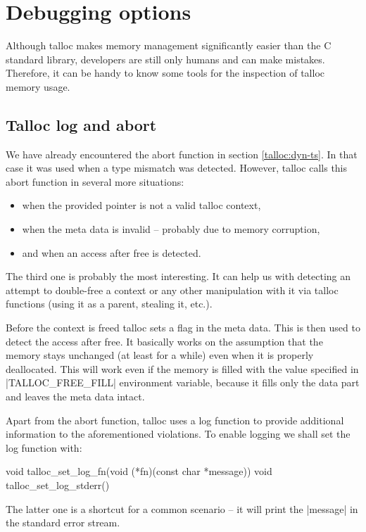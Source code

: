 \section{Debugging options}
\label{talloc:sec:debugging}

Although talloc makes memory management significantly easier than the C standard
library, developers are still only humans and can make mistakes. Therefore, it
can be handy to know some tools for the inspection of talloc memory usage.

\subsection{Talloc log and abort}

We have already encountered the abort function in section \ref{talloc:dyn-ts}.
In that case it was used when a type mismatch was detected. However, talloc
calls this abort function in several more situations:

\begin{itemize}
  \item when the provided pointer is not a valid talloc context,
  \item when the meta data is invalid -- probably due to memory corruption,
  \item and when an access after free is detected.
\end{itemize}

\noindent
The third one is probably the most interesting. It can help us with detecting
an attempt to double-free a context or any other manipulation with it via
talloc functions (using it as a parent, stealing it, etc.).

Before the context is freed talloc sets a flag in the meta data. This is then
used to detect the access after free. It basically works on the assumption that
the memory stays unchanged (at least for a while) even when it is properly
deallocated. This will work even if the memory is filled with the value
specified in |TALLOC_FREE_FILL| environment variable, because it fills only
the data part and leaves the meta data intact.

Apart from the abort function, talloc uses a log function to provide additional
information to the aforementioned violations. To enable logging we shall set the
log function with:

\begin{funcproto}
void talloc_set_log_fn(void (*fn)(const char *message))
void talloc_set_log_stderr()
\end{funcproto}
\funclistend
The latter one is a shortcut for a common scenario -- it will print the
|message| in the standard error stream.

